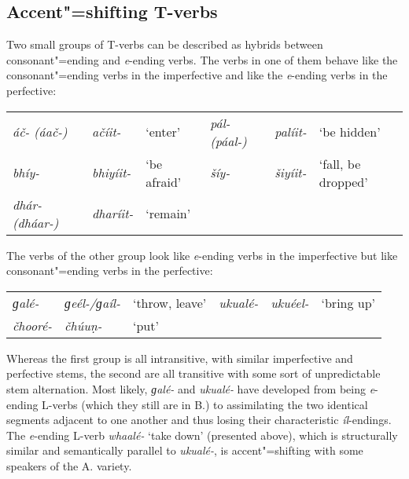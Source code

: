 \addtocounter{footnote}{-2}

\subsection{Accent"=shifting T-verbs}
\label{subsec:8-3-7}


Two small groups of T-verbs can be described as hybrids between consonant"=ending and \textit{e}-ending verbs. The verbs in one of them behave like the consonant"=ending verbs in the imperfective and like the \textit{e}-ending verbs in the perfective:


\begin{table}[H]
\begin{tabularx}{\textwidth}{ Q l l l l Q }
\textit{áč- (áač-)} &
\textit{ačíit-} &
`enter' &
\textit{pál- (páal-)} &
\textit{palíit-} &
`be hidden'\\
\textit{bhíy-} &
\textit{bhiyíit-} &
`be afraid' &
\textit{šíy-} &
\textit{šiyíit-} &
`fall, be dropped'\\
\textit{dhár- (dháar-)} &
\textit{dharíit-} &
`remain' &
&
&
\\
\end{tabularx}
\end{table}


The verbs of the other group look like \textit{e}-ending verbs in the imperfective but like consonant"=ending verbs in the perfective: 


\begin{table}[H]
\begin{tabularx}{\textwidth}{ Q l l Q Q l }

\textit{ɡalé-} &
\textit{ɡeél-/ɡaíl-} &
`throw, leave'{\protect\footnotemark} &
\textit{ukualé-} &
\textit{ukuéel-} &
`bring up'{\protect\footnotemark}\\
\textit{čhooré-} &
\textit{čhúuṇ-} &
`put' &
&
&
\\
\end{tabularx}
\end{table}

\addtocounter{footnote}{-2}

Whereas the first group is all intransitive, with similar imperfective and perfective stems, the second are all transitive with some sort of unpredictable stem alternation. Most likely, \textit{ɡalé-} and \textit{ukualé-} have developed from being \textit{e}-ending L-verbs (which they still are in B.) to assimilating the two identical segments adjacent to one another and thus losing their characteristic \textit{íl}-endings. The \textit{e}-ending L-verb \textit{whaalé-} `take down' (presented above), which is structurally similar and semantically parallel to \textit{ukualé-}, is accent"=shifting with some speakers of the A. variety. 


